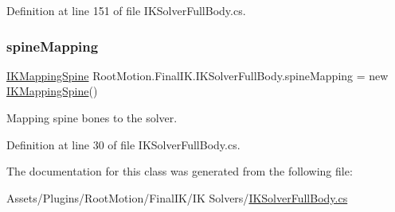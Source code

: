 Definition at line 151 of file I\+K\+Solver\+Full\+Body.\+cs.

\mbox{\label{class_root_motion_1_1_final_i_k_1_1_i_k_solver_full_body_a29f95d9ab15bf68b734d1b3e092571c3}} 
\subsubsection{\texorpdfstring{spine\+Mapping}{spineMapping}}
{\footnotesize\ttfamily \mbox{\hyperlink{class_root_motion_1_1_final_i_k_1_1_i_k_mapping_spine}{I\+K\+Mapping\+Spine}} Root\+Motion.\+Final\+I\+K.\+I\+K\+Solver\+Full\+Body.\+spine\+Mapping = new \mbox{\hyperlink{class_root_motion_1_1_final_i_k_1_1_i_k_mapping_spine}{I\+K\+Mapping\+Spine}}()}



Mapping spine bones to the solver. 



Definition at line 30 of file I\+K\+Solver\+Full\+Body.\+cs.



The documentation for this class was generated from the following file\+:\begin{DoxyCompactItemize}
\item 
Assets/\+Plugins/\+Root\+Motion/\+Final\+I\+K/\+I\+K Solvers/\mbox{\hyperlink{_i_k_solver_full_body_8cs}{I\+K\+Solver\+Full\+Body.\+cs}}\end{DoxyCompactItemize}
